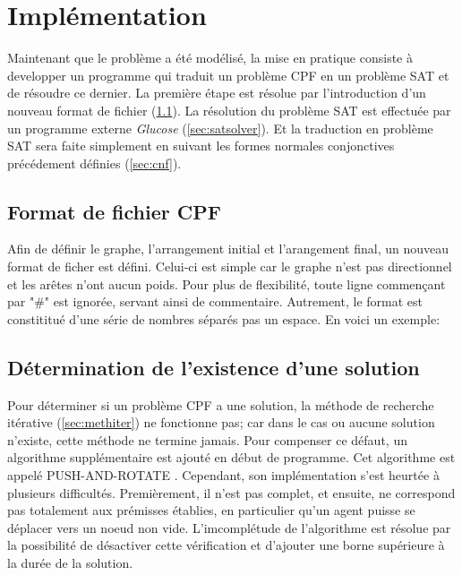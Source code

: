 \documentclass[french, 12pt, letterpaper]{article}
\theoremstyle{definition}
\theoremstyle{proposition}
\theoremstyle{example}
\begin{document}
    \newpage
    \section{Implémentation}

    Maintenant que le problème a été modélisé, la mise en pratique consiste à developper un programme qui traduit un problème CPF en 
    un problème SAT et de résoudre ce dernier.
    La première étape est résolue par l'introduction d'un nouveau format de fichier (\ref{sec:filecpf}).
    La résolution du problème SAT est effectuée par un programme externe \emph{Glucose} (\ref{sec:satsolver}). 
    Et la traduction en problème SAT sera faite simplement en suivant les formes normales conjonctives précédement définies (\ref{sec:cnf}). 

    \subsection{Format de fichier CPF}
    \label{sec:filecpf}

    Afin de définir le graphe, l'arrangement initial et l'arangement final, un nouveau format de ficher est défini.
    Celui-ci est simple car le graphe n'est pas directionnel et les arêtes n'ont aucun poids.
    Pour plus de flexibilité, toute ligne commençant par "\#" est ignorée, servant ainsi de commentaire. 
    Autrement, le format est constititué d'une série de nombres séparés pas un espace. 
    En voici un exemple:
    
    
        
    \subsection{Détermination de l'existence d'une solution}
    \label{sec:par}

    Pour déterminer si un problème CPF a une solution, la méthode de recherche itérative (\ref{sec:methiter}) ne fonctionne pas;
    car dans le cas ou aucune solution n'existe, cette méthode ne termine jamais.
    Pour compenser ce défaut, un algorithme supplémentaire est ajouté en début de programme.
    Cet algorithme est appelé PUSH-AND-ROTATE \cite{WILDEPAR}. 
    Cependant, son implémentation s'est heurtée à plusieurs difficultés. 
    Premièrement, il n'est pas complet, et ensuite, ne correspond pas totalement aux prémisses établies, en particulier 
    qu'un agent puisse se déplacer vers un noeud non vide.
    L'imcomplétude de l'algorithme est résolue par la possibilité de désactiver cette vérification et d'ajouter une borne 
    supérieure à la durée de la solution.
\end{document}

